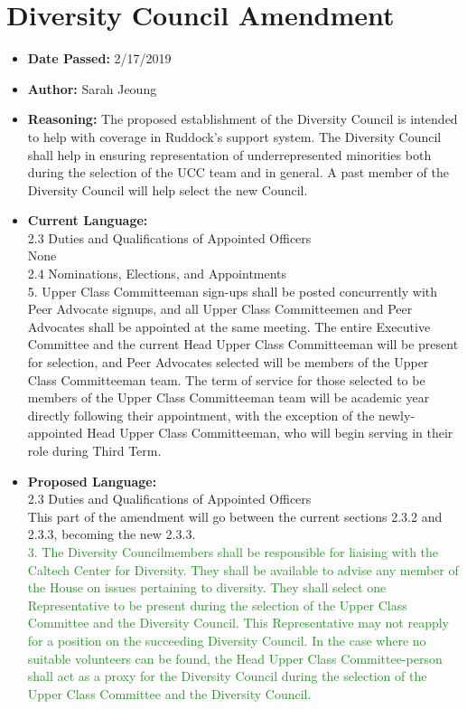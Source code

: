 \documentclass[10pt]{article} %
\begin{document}
\section{Diversity Council Amendment}
\begin{itemize}
	\item \textbf{Date Passed:} 2/17/2019
	\item \textbf{Author:} Sarah Jeoung
	\item \textbf{Reasoning:} The proposed establishment of the Diversity Council is intended to help with coverage in Ruddock's support system. The Diversity Council shall help in ensuring representation of underrepresented minorities both during the selection of the UCC team and in general. A past member of the Diversity Council will help select the new Council. 
	\item \textbf{Current Language:} \\
	2.3 Duties and Qualifications of Appointed Officers \\
	None \\
	2.4 Nominations, Elections, and Appointments \\
	5. Upper Class Committeeman sign-ups shall be posted concurrently with Peer Advocate signups, and all Upper Class Committeemen and Peer Advocates shall be appointed at the same meeting. The entire Executive Committee and the current Head Upper Class Committeeman will be present for selection, and Peer Advocates selected will be members of the Upper Class Committeeman team. The term of service for those selected to be members of the Upper Class Committeeman team will be academic year directly following their appointment, with the exception of the newly-appointed Head Upper Class Committeeman, who will begin serving in their role during Third Term. 
	\item \textbf{Proposed Language:} \\
	2.3 Duties and Qualifications of Appointed Officers \\
	This part of the amendment will go between the current sections 2.3.2 and 2.3.3, becoming the new 2.3.3. \\
	\textcolor{ForestGreen}{3. The Diversity Councilmembers shall be responsible for liaising with the Caltech Center for Diversity. They shall be available to advise any member of the House on issues pertaining to diversity. They shall select one Representative to be present during the selection of the Upper Class Committee and the Diversity Council. This Representative may not reapply for a position on the succeeding Diversity Council. In the case where no suitable volunteers can be found, the Head Upper Class Committee-person shall act as a proxy for the Diversity Council during the selection of the Upper Class Committee and the Diversity Council.} \\

\end{itemize}
\end{document}
